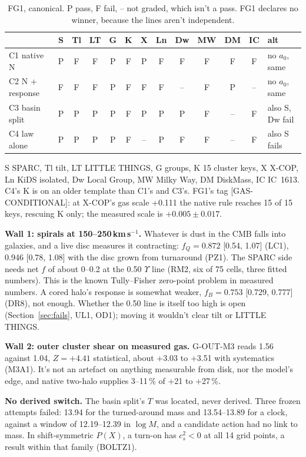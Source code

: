 \documentclass[10pt]{article}
\begin{document}
\begin{table}[h]\centering\small
\caption{FG1, canonical. P pass, F fail, -- not graded, which isn't a pass. FG1 declares no winner, because the lines aren't independent.}\label{tab:fg1}
\begin{tabular}{lcccccccccccl}
\toprule
 & S & Tl & LT & G & K & X & Ln & Dw & MW & DM & IC & alt\\
\midrule
C1 native N & P & F & F & P & F & P & F & F & F & F & F & no $a_0$, same\\
C2 N + response & F & F & F & P & F & F & F & -- & F & P & -- & no $a_0$, same\\
C3 basin split & P & P & P & P & F & P & P & P & F & -- & F & also S, Dw fail\\
C4 law alone & P & P & P & P & F & -- & P & F & F & -- & F & also S fails\\
\bottomrule
\end{tabular}
\end{table}
S SPARC, Tl tilt, LT LITTLE THINGS, G groups, K 15 cluster keys, X X-COP, Ln KiDS isolated, Dw Local Group, MW Milky Way, DM DiskMass, IC IC~1613. C4's K is on an older template than C1's and C3's. FG1's tag [GAS-CONDITIONAL]: at X-COP's gas scale +0.111 the native rule reaches 15 of 15 keys, rescuing K only; the measured scale is $+0.005\pm0.017$.

\textbf{Wall 1: spirals at 150--250\,km\,s$^{-1}$.} Whatever is dust in the CMB falls into galaxies, and a live disc measures it contracting: $f_Q=0.872$ [0.54, 1.07] (LC1), 0.946 [0.78, 1.08] with the disc grown from turnaround (PZ1). The SPARC side needs net $f$ of about 0--0.2 at the 0.50 $\Upsilon$ line (RM2, six of 75 cells, three fitted numbers). This is the known Tully--Fisher zero-point problem \cite{D08} in measured numbers. A cored halo's response is somewhat weaker, $f_B=0.753$ [0.729, 0.777] (DR8), not enough. Whether the 0.50 line is itself too high is open (Section~\ref{sec:fails}, UL1, OD1); moving it wouldn't clear tilt or LITTLE THINGS.

\textbf{Wall 2: outer cluster shear on measured gas.} G-OUT-M3 reads 1.56 against 1.04, $Z=+4.41$ statistical, about +3.03 to +3.51 with systematics (M3A1). It's not an artefact on anything measurable from disk, nor the model's edge, and native two-halo supplies 3--11\,\% of +21 to +27\,\%.

\textbf{No derived switch.} The basin split's $T$ was located, never derived. Three frozen attempts failed: 13.94 for the turned-around mass and 13.54--13.89 for a clock, against a window of 12.19--12.39 in $\log M$, and a candidate action had no link to mass. In shift-symmetric $P(X)$, a turn-on has $c_s^2<0$ at all 14 grid points, a result within that family (BOLTZ1).
\end{document}
